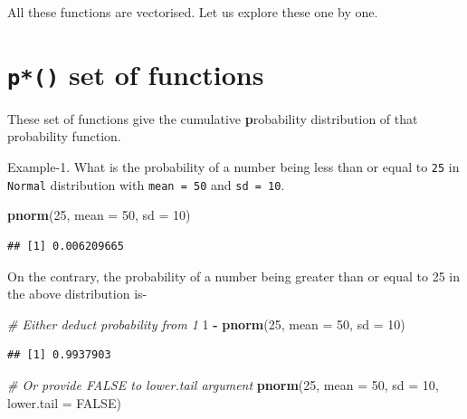 \documentclass[
]{book}
\newenvironment{Shaded}{\begin{snugshade}}{\end{snugshade}}
\newcommand{\AttributeTok}[1]{\textcolor[rgb]{0.13,0.29,0.53}{#1}}
\newcommand{\CommentTok}[1]{\textcolor[rgb]{0.56,0.35,0.01}{\textit{#1}}}
\newcommand{\ConstantTok}[1]{\textcolor[rgb]{0.56,0.35,0.01}{#1}}
\newcommand{\DecValTok}[1]{\textcolor[rgb]{0.00,0.00,0.81}{#1}}
\newcommand{\FunctionTok}[1]{\textcolor[rgb]{0.13,0.29,0.53}{\textbf{#1}}}
\newcommand{\NormalTok}[1]{#1}
\newcommand{\SpecialCharTok}[1]{\textcolor[rgb]{0.81,0.36,0.00}{\textbf{#1}}}
\begin{document}
All these functions are vectorised. Let us explore these one by one.

\hypertarget{p-set-of-functions}{%
\section{\texorpdfstring{\texttt{p*()} set of functions}{p*() set of functions}}\label{p-set-of-functions}}

These set of functions give the cumulative \textbf{p}robability distribution of that probability function.

Example-1. What is the probability of a number being less than or equal to \texttt{25} in \texttt{Normal} distribution with \texttt{mean\ =\ 50} and \texttt{sd\ =\ 10}.

\begin{Shaded}
\begin{Highlighting}[]
\FunctionTok{pnorm}\NormalTok{(}\DecValTok{25}\NormalTok{, }\AttributeTok{mean =} \DecValTok{50}\NormalTok{, }\AttributeTok{sd =} \DecValTok{10}\NormalTok{)}
\end{Highlighting}
\end{Shaded}

\begin{verbatim}
## [1] 0.006209665
\end{verbatim}

On the contrary, the probability of a number being greater than or equal to 25 in the above distribution is-

\begin{Shaded}
\begin{Highlighting}[]
\CommentTok{\# Either deduct probability from 1 }
\DecValTok{1} \SpecialCharTok{{-}} \FunctionTok{pnorm}\NormalTok{(}\DecValTok{25}\NormalTok{, }\AttributeTok{mean =} \DecValTok{50}\NormalTok{, }\AttributeTok{sd =} \DecValTok{10}\NormalTok{)}
\end{Highlighting}
\end{Shaded}

\begin{verbatim}
## [1] 0.9937903
\end{verbatim}

\begin{Shaded}
\begin{Highlighting}[]
\CommentTok{\# Or provide FALSE to lower.tail argument}
\FunctionTok{pnorm}\NormalTok{(}\DecValTok{25}\NormalTok{, }\AttributeTok{mean =} \DecValTok{50}\NormalTok{, }\AttributeTok{sd =} \DecValTok{10}\NormalTok{, }\AttributeTok{lower.tail =} \ConstantTok{FALSE}\NormalTok{)}
\end{Highlighting}
\end{Shaded}
\end{document}
